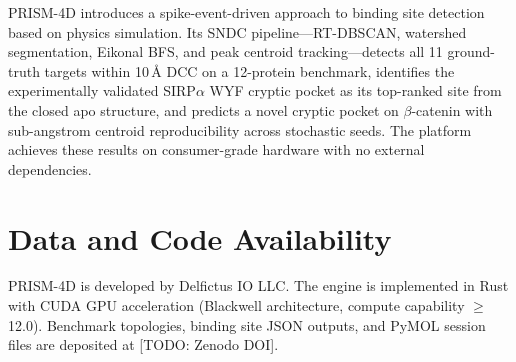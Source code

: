 \documentclass[11pt,twocolumn]{article}
\begin{document}
PRISM-4D introduces a spike-event-driven approach to binding site detection based on physics
simulation. Its SNDC pipeline---RT-DBSCAN, watershed segmentation, Eikonal BFS, and peak
centroid tracking---detects all 11 ground-truth targets within 10\,\AA{} DCC on a 12-protein
benchmark, identifies the experimentally validated SIRP$\alpha$ WYF cryptic pocket as its
top-ranked site from the closed apo structure, and predicts a novel cryptic pocket on
$\beta$-catenin with sub-angstrom centroid reproducibility across stochastic seeds. The
platform achieves these results on consumer-grade hardware with no external dependencies.

\section{Data and Code Availability}

PRISM-4D is developed by Delfictus IO LLC. The engine is implemented in Rust with CUDA GPU
acceleration (Blackwell architecture, compute capability $\geq$12.0). Benchmark topologies,
binding site JSON outputs, and PyMOL session files are deposited at [TODO: Zenodo DOI].


% 
\end{document}

